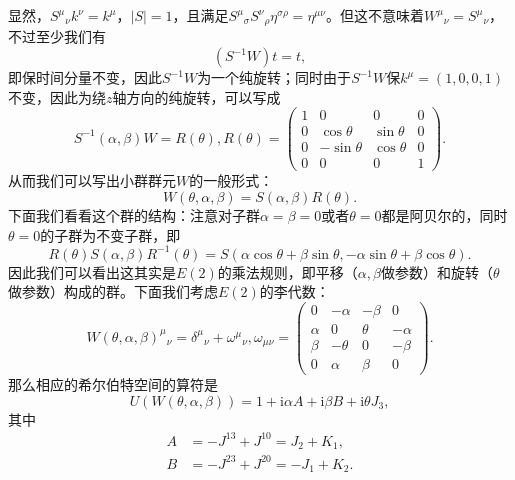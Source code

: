 显然，$ S^{\mu }{}_{\nu } k^{\nu } =k^{\mu }$，$ | S| =1$，且满足$ S^{\mu }{}_{\sigma } S^{\nu }{}_{\rho } \eta ^{\sigma \rho } =\eta ^{\mu \nu }$。但这不意味着$ W^{\mu }{}_{\nu } =S^{\mu }{}_{\nu }$，不过至少我们有
\begin{equation*}
	(S^{-1} W)t=t,
\end{equation*}
即保时间分量不变，因此$ S^{-1} W$为一个纯旋转；同时由于$ S^{-1} W$保$ k^{\mu } =( 1,0,0,1)$不变，因此为绕$ z$轴方向的纯旋转，可以写成
\begin{equation*}
	S^{-1}( \alpha ,\beta ) W=R( \theta ) ,R( \theta ) =\begin{pmatrix}
		1 & 0 & 0 & 0\\
		0 & \cos \theta  & \sin \theta  & 0\\
		0 & -\sin \theta  & \cos \theta  & 0\\
		0 & 0 & 0 & 1
	\end{pmatrix} .
\end{equation*}
从而我们可以写出小群群元$ W$的一般形式：
\begin{equation*}
	W( \theta ,\alpha ,\beta ) =S( \alpha ,\beta ) R( \theta ) .
\end{equation*}
下面我们看看这个群的结构：注意对子群$ \alpha =\beta =0$或者$ \theta =0$都是阿贝尔的，同时$ \theta =0$的子群为不变子群，即
\begin{equation*}
	R( \theta ) S( \alpha ,\beta ) R^{-1}( \theta ) =S( \alpha \cos \theta +\beta \sin \theta ,-\alpha \sin \theta +\beta \cos \theta ) .
\end{equation*}
因此我们可以看出这其实是$ E( 2)$的乘法规则，即平移（$ \alpha ,\beta $做参数）和旋转（$ \theta $做参数）构成的群。下面我们考虑$ E( 2)$的李代数：
\begin{equation*}
	W( \theta ,\alpha ,\beta )^{\mu }{}_{\nu } =\delta ^{\mu }{}_{\nu } +\omega ^{\mu }{}_{\nu } ,\omega _{\mu \nu } =\begin{pmatrix}
		0 & -\alpha  & -\beta  & 0\\
		\alpha  & 0 & \theta  & -\alpha \\
		\beta  & -\theta  & 0 & -\beta \\
		0 & \alpha  & \beta  & 0
	\end{pmatrix} .
\end{equation*}
那么相应的希尔伯特空间的算符是
\begin{equation*}
	U( W( \theta ,\alpha ,\beta )) =1+\mathrm{i} \alpha A+\mathrm{i} \beta B+\mathrm{i} \theta J_{3} ,
\end{equation*}
其中
\begin{equation*}
	\begin{aligned}
		A & =-J^{13} +J^{10} =J_{2} +K_{1} ,\\
		B & =-J^{23} +J^{20} =-J_{1} +K_{2} .
	\end{aligned}
\end{equation*}
